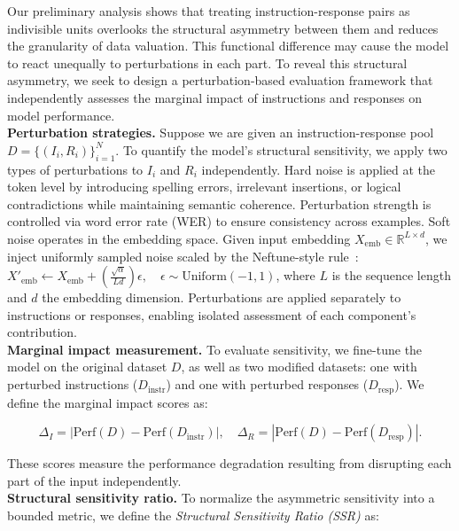 \documentclass[12pt,a4paper]{article}
\begin{document}
Our preliminary analysis shows that treating instruction-response pairs as indivisible units overlooks the structural asymmetry between them and reduces the granularity of data valuation. This functional difference may cause the model to react unequally to perturbations in each part. To reveal this structural asymmetry, we seek to design a perturbation-based evaluation framework that independently assesses the marginal impact of instructions and responses on model performance. \\
\textbf{Perturbation strategies.} Suppose we are given an instruction-response pool $ D = \{(I_i, R_i)\}_{i=1}^N $. To quantify the model’s structural sensitivity, we apply two types of perturbations to $I_i$ and $R_i$ independently. Hard noise is applied at the token level by introducing spelling errors, irrelevant insertions, or logical contradictions while maintaining semantic coherence. Perturbation strength is controlled via word error rate (WER) to ensure consistency across examples. Soft noise operates in the embedding space. Given input embedding $ X_{\text{emb}} \in \mathbb{R}^{L \times d} $, we inject uniformly sampled noise scaled by the Neftune-style rule~\cite{DBLP:conf/iclr/JainCWKCSBKSSGG24}:$ X'_{\text{emb}} \leftarrow X_{\text{emb}} + \left( \frac{\sqrt{\alpha}}{Ld} \right)\epsilon, \quad \epsilon \sim \text{Uniform}(-1, 1) $, where $L$ is the sequence length and $d$ the embedding dimension. Perturbations are applied separately to instructions or responses, enabling isolated assessment of each component’s contribution. \\
\textbf{Marginal impact measurement.} To evaluate sensitivity, we fine-tune the model on the original dataset $D$, as well as two modified datasets: one with perturbed instructions ($D_{\text{instr}}$) and one with perturbed responses ($D_{\text{resp}}$). We define the marginal impact scores as: 

\vspace{-1em}
\begin{equation}
\Delta_I = \left| \text{Perf}(D) - \text{Perf}(D_{\text{instr}}) \right|, \quad
\Delta_R = \left| \text{Perf}(D) - \text{Perf}(D_{\text{resp}}) \right|.
\end{equation}
\vspace{-1em}

These scores measure the performance degradation resulting from disrupting each part of the input independently.\\
\textbf{Structural sensitivity ratio.} To normalize the asymmetric sensitivity into a bounded metric, we define the \textit{Structural Sensitivity Ratio (SSR)} as:
\end{document}
